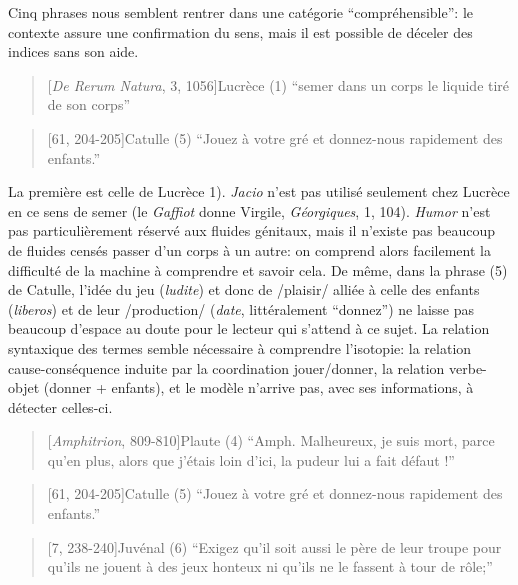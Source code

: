 Cinq phrases nous semblent rentrer dans une catégorie ``compréhensible'': le contexte assure une confirmation du sens, mais il est possible de déceler des indices sans son aide.

\begin{quote}[\textit{De Rerum Natura}, 3, 1056]{Lucrèce}
    (1) \enquote{semer dans un corps le liquide tiré de son corps}
\end{quote}

\begin{quote}[61, 204-205]{Catulle}
     (5) \enquote{Jouez à votre gré et donnez-nous rapidement des enfants.}
\end{quote}

La première est celle de Lucrèce 1). \textit{Jacio} n'est pas utilisé seulement chez Lucrèce en ce sens de semer (le \textit{Gaffiot} donne Virgile, \textit{Géorgiques}, 1, 104). \textit{Humor} n'est pas particulièrement réservé aux fluides génitaux, mais il n'existe pas beaucoup de fluides censés passer d'un corps à un autre: on comprend alors facilement la difficulté de la machine à comprendre et savoir cela. De même, dans la phrase (5) de Catulle, l'idée du jeu (\textit{ludite}) et donc de /plaisir/ alliée à celle des enfants (\textit{liberos}) et de leur /production/ (\textit{date}, littéralement ``donnez'') ne laisse pas beaucoup d'espace au doute pour le lecteur qui s'attend à ce sujet. La relation syntaxique des termes semble nécessaire à comprendre l'isotopie: la relation cause-conséquence induite par la coordination jouer/donner, la relation verbe-objet (donner + enfants), et le modèle n'arrive pas, avec ses informations, à détecter celles-ci.

\begin{quote}[\textit{Amphitrion}, 809-810]{Plaute}
	(4) ``Amph. Malheureux, je suis mort, parce qu’en plus, alors que j’étais loin d’ici, la pudeur lui a fait défaut !''
\end{quote}

\begin{quote}[61, 204-205]{Catulle}
	(5) ``Jouez à votre gré et donnez-nous rapidement des enfants.''

\end{quote}

\begin{quote}[7, 238-240]{Juvénal}
	(6) ``Exigez qu’il soit aussi le père de leur troupe pour qu’ils ne jouent à des jeux honteux ni qu’ils ne le fassent à tour de rôle;''
\end{quote}

